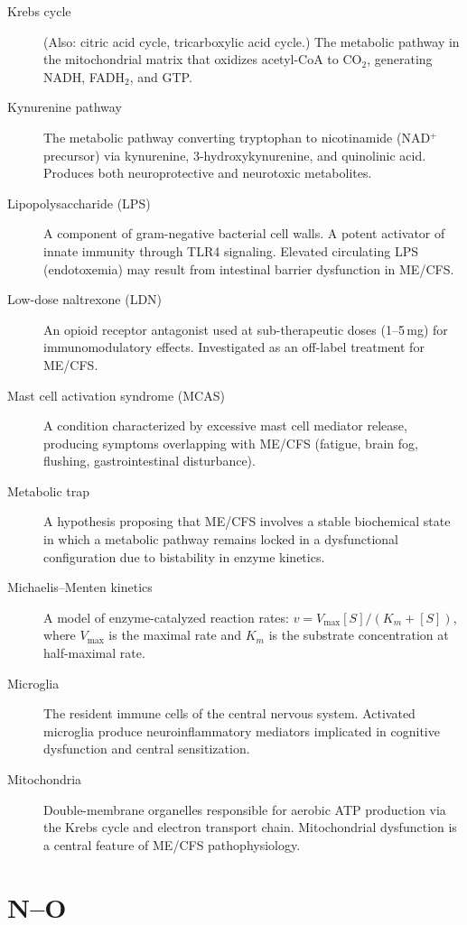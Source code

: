 \begin{description}
\item[Krebs cycle] (Also: citric acid cycle, tricarboxylic acid cycle.) The metabolic pathway in the mitochondrial matrix that oxidizes acetyl-CoA to CO$_2$, generating NADH, FADH$_2$, and GTP.
\item[Kynurenine pathway] The metabolic pathway converting tryptophan to nicotinamide (NAD$^+$ precursor) via kynurenine, 3-hydroxykynurenine, and quinolinic acid. Produces both neuroprotective and neurotoxic metabolites.
\item[Lipopolysaccharide (LPS)] A component of gram-negative bacterial cell walls. A potent activator of innate immunity through TLR4 signaling. Elevated circulating LPS (endotoxemia) may result from intestinal barrier dysfunction in ME/CFS.
\item[Low-dose naltrexone (LDN)] An opioid receptor antagonist used at sub-therapeutic doses (1--5\,mg) for immunomodulatory effects. Investigated as an off-label treatment for ME/CFS.
\item[Mast cell activation syndrome (MCAS)] A condition characterized by excessive mast cell mediator release, producing symptoms overlapping with ME/CFS (fatigue, brain fog, flushing, gastrointestinal disturbance).
\item[Metabolic trap] A hypothesis proposing that ME/CFS involves a stable biochemical state in which a metabolic pathway remains locked in a dysfunctional configuration due to bistability in enzyme kinetics.
\item[Michaelis--Menten kinetics] A model of enzyme-catalyzed reaction rates: $v = V_{\max}[S]/(K_m + [S])$, where $V_{\max}$ is the maximal rate and $K_m$ is the substrate concentration at half-maximal rate.
\item[Microglia] The resident immune cells of the central nervous system. Activated microglia produce neuroinflammatory mediators implicated in cognitive dysfunction and central sensitization.
\item[Mitochondria] Double-membrane organelles responsible for aerobic ATP production via the Krebs cycle and electron transport chain. Mitochondrial dysfunction is a central feature of ME/CFS pathophysiology.
\end{description}

\section*{N--O}

